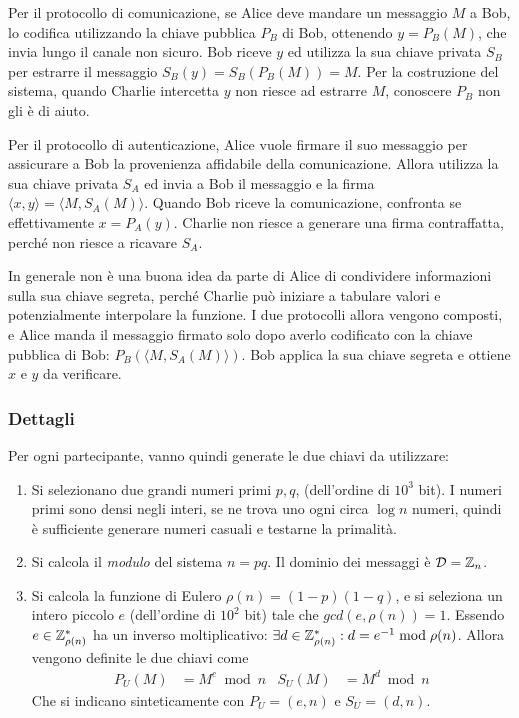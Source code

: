 Per il protocollo di comunicazione, se Alice deve mandare un messaggio $M$ a Bob,
lo codifica utilizzando la chiave pubblica $P_B$ di Bob, ottenendo $
y = P_B(M)
$, che invia lungo il canale non sicuro.
Bob riceve $y$ ed utilizza la sua chiave privata $S_B$ per estrarre il messaggio $
S_B(y) = 
S_B \left( P_B \left( M \right) \right) = M
$.
Per la costruzione del sistema, quando Charlie intercetta $y$ non riesce ad estrarre $M$, conoscere $P_B$ non gli è di aiuto.

Per il protocollo di autenticazione, Alice vuole firmare il suo messaggio per assicurare a Bob la provenienza affidabile della comunicazione. Allora utilizza la sua chiave privata $S_A$ ed invia a Bob il messaggio e la firma $
\langle x, y \rangle
=
\langle M, S_A(M) \rangle
$. Quando Bob riceve la comunicazione, confronta se effettivamente $
x = P_A(y)
$.
Charlie non riesce a generare una firma contraffatta, perché non riesce a ricavare $S_A$.

In generale non è una buona idea da parte di Alice di condividere informazioni sulla sua chiave segreta, perché Charlie può iniziare a tabulare valori e potenzialmente interpolare la funzione.
I due protocolli allora vengono composti, e Alice manda il messaggio firmato solo dopo averlo codificato con la chiave pubblica di Bob: $
P_B \left( 
\langle M, S_A(M) \rangle
\right)
$. Bob applica la sua chiave segreta e ottiene $x$ e $y$ da verificare.

\subsubsection{Dettagli}

Per ogni partecipante, vanno quindi generate le due chiavi da utilizzare:
\begin{enumerate}
    \item Si selezionano due grandi numeri primi $p,q$, (dell'ordine di $10^3$ bit).
        I numeri primi sono densi negli interi, se ne trova uno ogni circa $\log n$ numeri, quindi è sufficiente generare numeri casuali e testarne la primalità.
    \item Si calcola il \emph{modulo} del sistema $n = pq$. Il dominio dei messaggi è $\mathcal{D} =  \mathbb{Z}_{n} $.
    \item Si calcola la funzione di Eulero $\rho(n) = \left( 1-p \right) \left( 1-q \right) $, e si seleziona un intero piccolo $e$ (dell'ordine di $10^2$ bit) tale che 
        $
        gcd(e, \rho(n)) = 1
        $.
        Essendo $
        e \in \mathbb{Z}_{\rho(n)}^{*} 
        $ ha un inverso moltiplicativo: $
        \exists d \in \mathbb{Z}_{\rho(n)}^{*} 
        : d = e^{-1} \bmod \rho(n)
        $. Allora vengono definite le due chiavi come
        \begin{align*}
            P_U(M) &= M^e \bmod n 
            &
            S_U(M) &= M^d \bmod n 
        \end{align*}
        Che si indicano sinteticamente con $
        P_U = \left( e, n \right)
        $ e $
        S_U = \left( d, n \right)
        $.
\end{enumerate}

